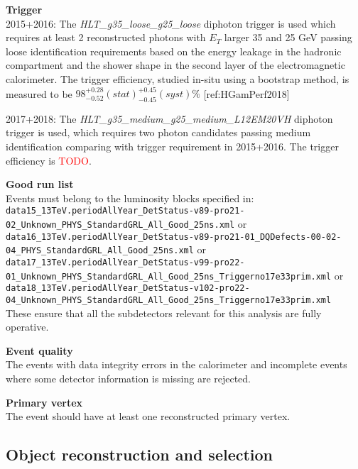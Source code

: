 \begin{description}
\item{\textbf{Trigger}} \\
2015+2016: The \emph{HLT\_g35\_loose\_g25\_loose} diphoton trigger is used which requires at least 2 reconstructed photons with $E_{T}$ larger 35 and 25 GeV passing loose identification requirements based on the energy leakage in the hadronic compartment and the shower shape in the second layer of the electromagnetic calorimeter. The trigger efficiency, studied in-situ using a bootstrap method, is measured to be $98^{+0.28}_{-0.52}(stat)^{+0.45}_{-0.45}(syst)\%$ [ref:HGamPerf2018]

2017+2018: The \emph{HLT\_g35\_medium\_g25\_medium\_L12EM20VH} diphoton trigger is used, which requires two photon candidates passing medium identification comparing with trigger requirement in 2015+2016. The trigger efficiency is \textcolor{red}{TODO}. 

\item{\textbf{Good run list}} \\
Events must belong to the luminosity blocks specified in: \\
\verb|data15_13TeV.periodAllYear_DetStatus-v89-pro21-02_Unknown_PHYS_StandardGRL_All_Good_25ns.xml| or \\
\verb|data16_13TeV.periodAllYear_DetStatus-v89-pro21-01_DQDefects-00-02-04_PHYS_StandardGRL_All_Good_25ns.xml| or \\
\verb|data17_13TeV.periodAllYear_DetStatus-v99-pro22-01_Unknown_PHYS_StandardGRL_All_Good_25ns_Triggerno17e33prim.xml| or \\
\verb|data18_13TeV.periodAllYear_DetStatus-v102-pro22-04_Unknown_PHYS_StandardGRL_All_Good_25ns_Triggerno17e33prim.xml| \\
These ensure that all the subdetectors relevant for this analysis are fully operative. 

\item{\textbf{Event quality}} \\
The events with data integrity errors in the calorimeter and incomplete events where some detector information is missing are rejected. 

\item{\textbf{Primary vertex}} \\
The event should have at least one reconstructed primary vertex.

\end{description}


\subsection{Object reconstruction and selection}
\label{subsec:objrecon}

